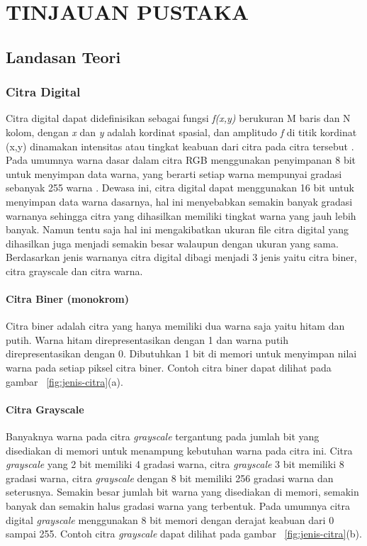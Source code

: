 
\chapter{TINJAUAN PUSTAKA}


\section{Landasan Teori}

\subsection{Citra Digital}
Citra digital dapat didefinisikan sebagai fungsi \textit{f(x,y)} berukuran M baris dan N kolom, dengan \textit{x} dan \textit{y} adalah kordinat spasial, dan amplitudo \textit{f} di titik kordinat (x,y) dinamakan intensitas atau tingkat keabuan dari citra pada citra tersebut . Pada umumnya warna dasar dalam citra RGB menggunakan penyimpanan 8 bit untuk menyimpan data warna, yang berarti setiap warna mempunyai gradasi sebanyak 255 warna . Dewasa ini, citra digital dapat menggunakan 16 bit untuk menyimpan data warna dasarnya, hal ini menyebabkan semakin banyak gradasi warnanya sehingga citra yang dihasilkan memiliki tingkat warna yang jauh lebih banyak. Namun tentu saja hal ini mengakibatkan ukuran file citra digital yang dihasilkan juga menjadi semakin besar walaupun dengan ukuran yang sama. Berdasarkan jenis warnanya citra digital dibagi menjadi 3 jenis yaitu citra biner, citra grayscale dan citra warna.

\subsubsection{Citra Biner (monokrom)} 
Citra biner adalah citra yang hanya memiliki dua warna saja yaitu hitam dan putih. Warna hitam direpresentasikan dengan 1 dan warna putih direpresentasikan dengan 0. Dibutuhkan 1 bit di memori untuk menyimpan nilai warna pada setiap piksel citra biner. Contoh citra biner dapat dilihat pada gambar ~\ref{fig:jenis-citra}(a).

\subsubsection{Citra Grayscale}
Banyaknya warna pada citra \textit{grayscale} tergantung pada jumlah bit yang disediakan di memori untuk menampung kebutuhan warna pada citra ini. Citra \textit{grayscale} yang 2 bit memiliki 4 gradasi warna, citra \textit{grayscale} 3 bit memiliki 8 gradasi warna, citra \textit{grayscale} dengan 8 bit memiliki 256 gradasi warna dan seterusnya. Semakin besar jumlah bit warna yang disediakan di memori, semakin banyak dan semakin halus gradasi warna yang terbentuk. Pada umumnya citra digital \textit{grayscale} menggunakan 8 bit memori dengan derajat keabuan dari 0 sampai 255. Contoh citra \textit{grayscale} dapat dilihat pada gambar ~\ref{fig:jenis-citra}(b).

